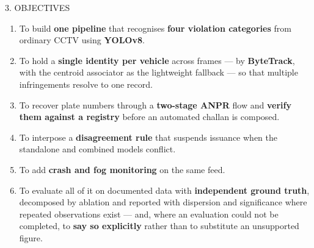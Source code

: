 \documentclass[aspectratio=169,10pt,t]{beamer}
\begin{document}
\begin{frame}{3. OBJECTIVES}
\small
\vspace{0.3em}
\begin{enumerate}\setlength{\itemsep}{0.5em}
  \item To build \textbf{one pipeline} that recognises \textbf{four violation categories} from ordinary CCTV using
        \textbf{YOLOv8}.
  \item To hold a \textbf{single identity per vehicle} across frames --- by \textbf{ByteTrack}, with the centroid
        associator as the lightweight fallback --- so that multiple infringements resolve to one record.
  \item To recover plate numbers through a \textbf{two-stage ANPR} flow and \textbf{verify them against a registry}
        before an automated challan is composed.
  \item To interpose a \textbf{disagreement rule} that suspends issuance when the standalone and combined models
        conflict.
  \item To add \textbf{crash and fog monitoring} on the same feed.
  \item To evaluate all of it on documented data with \textbf{independent ground truth}, decomposed by ablation and
        reported with dispersion and significance where repeated observations exist --- and, where an evaluation could
        not be completed, to \textbf{say so explicitly} rather than to substitute an unsupported figure.
\end{enumerate}
\end{frame}
\end{document}
